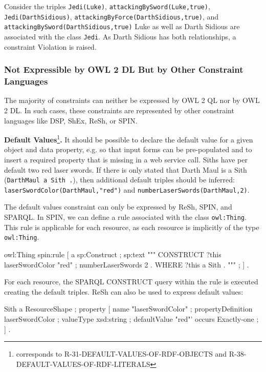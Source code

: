 \documentclass{llncs}
\newcommand{\ms}[1]{\texttt{#1}}
\begin{document}
Consider the triples \ms{Jedi(Luke)}, \ms{attackingBySword(Luke,true)}, \ms{Jedi(DarthSidious)},
\ms{attackingByForce(DarthSidious,true)}, and \ms{attackingBySword(DarthSidious,true)}
Luke as well as Darth Sidious are associated with the class \ms{Jedi}.
As Darth Sidious has both relationships, a constraint Violation is raised.

\subsubsection{Not Expressible by OWL 2 DL But by Other Constraint Languages}

The majority of constraints can neither be expressed by OWL 2 QL nor by OWL 2 DL. 
In such cases, these constraints are represented by other constraint languages like DSP, ShEx, ReSh, or SPIN.

\textbf{Default Values}\footnote{corresponds to R-31-DEFAULT-VALUES-OF-RDF-OBJECTS and R-38-DEFAULT-VALUES-OF-RDF-LITERALS}\textbf{.}
It should be possible to declare the default value for a given object and data property, e.g. so that input forms can be pre-populated and to insert a required property that is missing in a web service call. 
Siths have per default two red laser swords.
If there is only stated that Darth Maul is a Sith (\ms{DarthMaul a Sith .}), then additional default triples should be inferred: 
\ms{laserSwordColor(DarthMaul,"red")} and \ms{numberLaserSwords(DarthMaul,2)}.

The default values constraint can only be expressed by ReSh, SPIN, and SPARQL.
In SPIN, we can define a rule associated with the class \ms{owl:Thing}.
This rule is applicable for each resource, as each resource is implicitly of the type \ms{owl:Thing}. 

\begin{ex}
owl:Thing spin:rule [ a sp:Construct ; sp:text """
    CONSTRUCT {
        ?this laserSwordColor "red" ;
              numberLaserSwords 2 . }
    WHERE {             
        ?this a Sith . } """ ; ] .
\end{ex}

For each resource, the SPARQL CONSTRUCT query within the rule is executed creating the default triples.
ReSh can also be used to express default values:

\begin{ex}
Sith a ResourceShape ;
    property [
        name "laserSwordColor" ;
        propertyDefinition laserSwordColor ;
        valueType xsd:string ;
        defaultValue "red"'
        occurs Exactly-one ; ] .
\end{ex}
\end{document}
